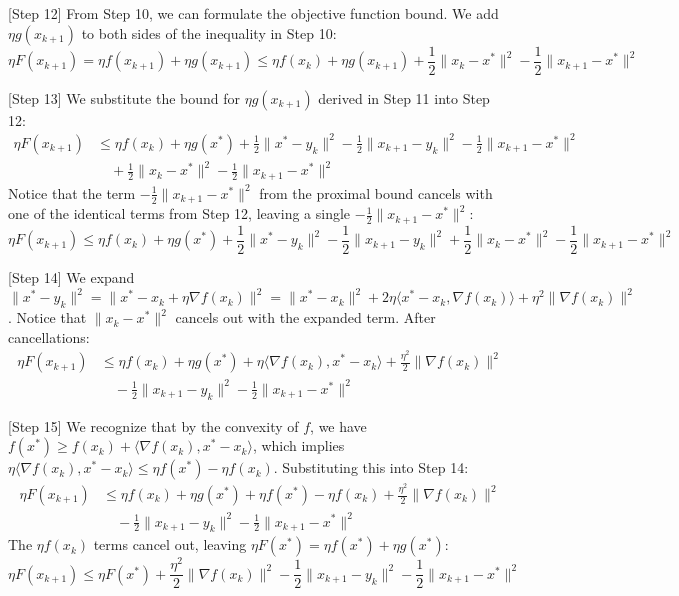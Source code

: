 \documentclass{article}
\begin{document}
[Step 12] From Step 10, we can formulate the objective function bound. We add $\eta g(x_{k+1})$ to both sides of the inequality in Step 10:
\begin{equation}
\eta F(x_{k+1}) = \eta f(x_{k+1}) + \eta g(x_{k+1}) \leq \eta f(x_k) + \eta g(x_{k+1}) + \frac{1}{2} \|x_k - x^*\|^2 - \frac{1}{2} \|x_{k+1} - x^*\|^2
\end{equation}

[Step 13] We substitute the bound for $\eta g(x_{k+1})$ derived in Step 11 into Step 12:
\begin{align}
\eta F(x_{k+1}) &\leq \eta f(x_k) + \eta g(x^*) + \frac{1}{2} \|x^* - y_k\|^2 - \frac{1}{2} \|x_{k+1} - y_k\|^2 - \frac{1}{2} \|x_{k+1} - x^*\|^2 \\ 
&\quad + \frac{1}{2} \|x_k - x^*\|^2 - \frac{1}{2} \|x_{k+1} - x^*\|^2
\end{align}
Notice that the term $-\frac{1}{2}\|x_{k+1} - x^*\|^2$ from the proximal bound cancels with one of the identical terms from Step 12, leaving a single $-\frac{1}{2}\|x_{k+1} - x^*\|^2$:
\begin{equation}
\eta F(x_{k+1}) \leq \eta f(x_k) + \eta g(x^*) + \frac{1}{2} \|x^* - y_k\|^2 - \frac{1}{2} \|x_{k+1} - y_k\|^2 + \frac{1}{2} \|x_k - x^*\|^2 - \frac{1}{2} \|x_{k+1} - x^*\|^2
\end{equation}

[Step 14] We expand $\|x^* - y_k\|^2 = \|x^* - x_k + \eta \nabla f(x_k)\|^2 = \|x^* - x_k\|^2 + 2\eta \langle x^* - x_k, \nabla f(x_k) \rangle + \eta^2 \|\nabla f(x_k)\|^2$. Notice that $\|x_k - x^*\|^2$ cancels out with the expanded term. After cancellations:
\begin{align}
\eta F(x_{k+1}) &\leq \eta f(x_k) + \eta g(x^*) + \eta \langle \nabla f(x_k), x^* - x_k \rangle + \frac{\eta^2}{2} \|\nabla f(x_k)\|^2 \\
&\quad - \frac{1}{2} \|x_{k+1} - y_k\|^2 - \frac{1}{2} \|x_{k+1} - x^*\|^2
\end{align}

[Step 15] We recognize that by the convexity of $f$, we have $f(x^*) \geq f(x_k) + \langle \nabla f(x_k), x^* - x_k \rangle$, which implies $\eta \langle \nabla f(x_k), x^* - x_k \rangle \leq \eta f(x^*) - \eta f(x_k)$. Substituting this into Step 14:
\begin{align}
\eta F(x_{k+1}) &\leq \eta f(x_k) + \eta g(x^*) + \eta f(x^*) - \eta f(x_k) + \frac{\eta^2}{2} \|\nabla f(x_k)\|^2 \\
&\quad - \frac{1}{2} \|x_{k+1} - y_k\|^2 - \frac{1}{2} \|x_{k+1} - x^*\|^2
\end{align}
The $\eta f(x_k)$ terms cancel out, leaving $\eta F(x^*) = \eta f(x^*) + \eta g(x^*)$:
\begin{equation}
\eta F(x_{k+1}) \leq \eta F(x^*) + \frac{\eta^2}{2} \|\nabla f(x_k)\|^2 - \frac{1}{2} \|x_{k+1} - y_k\|^2 - \frac{1}{2} \|x_{k+1} - x^*\|^2
\end{equation}
\end{document}
